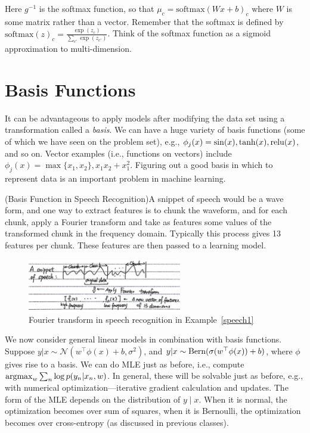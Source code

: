 \documentclass{article}
\begin{document}
\begin{example}
    Here $g^{-1}$ is the softmax function, so that $\mu_c = \text{softmax}(Wx+b)_c$ where $W$ is some matrix rather than a vector.  Remember that the softmax is defined by $\text{softmax}(z)_c = \frac{\exp(z_c)}{\sum_{c'} \exp(z_{c'})}$.  Think of the softmax function as a sigmoid approximation to multi-dimension.
\end{example}

\section{Basis Functions}

It can be advantageous to apply models after modifying the data set using a transformation called a \emph{basis}.  We can have a huge variety of basis functions (some of which we have seen on the problem set), e.g., $\phi_j(x) = \sin(x), \tanh(x), \operatorname{relu}(x)$, and so on. Vector examples (i.e., functions on vectors) include $\phi_j(x) = \max\{x_1, x_2\}, x_1 x_2 + x_1^2$. Figuring out a good basis in which to represent data is an important problem in machine learning.

\begin{example}
\label{speech1}

  (Basis Function in Speech Recognition)A snippet of speech would be a wave form, and one way to extract features is to chunk the waveform, and for each chunk, apply a Fourier transform and take as features some values of the transformed chunk in the frequency domain.  Typically this process gives 13 features per chunk.  These features are then passed to a learning model.
    \begin{figure}[!ht]
    \centering
    \includegraphics[width = 0.6\textwidth]{speech1.jpg}
    \caption{Fourier transform in speech recognition in Example~\ref{speech1}}
    \end{figure}
\end{example}

We now consider general linear models in combination with basis functions. Suppose $y | x\sim\mathcal{N}(w^\top\phi(x) + b, \sigma^2)$, and $y | x\sim\operatorname{Bern}(\sigma(w^\top \phi(x)) + b)$, where $\phi$ gives rise to a basis. We can do MLE just as before, i.e., compute $\operatorname{argmax}_w \sum_n \log p(y_n | x_n, w)$. In general, these will be solvable just as before, e.g., with numerical optimization---iterative gradient calculation and updates. The form of the MLE depends on the distribution of $y \mid x$. When it is normal, the optimization becomes over sum of squares, when it is Bernoulli, the optimization becomes over cross-entropy (as discussed in previous classes).
\end{document}
